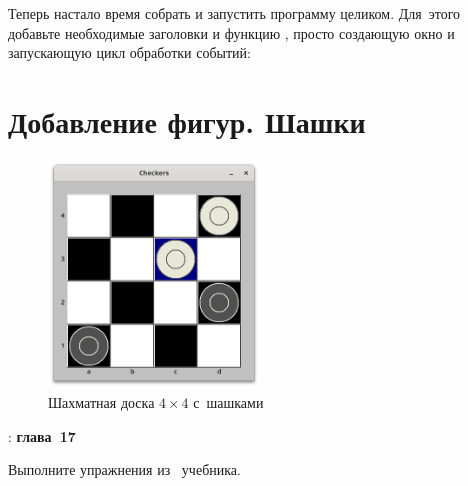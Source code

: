 Теперь настало время собрать и запустить программу целиком. Для~этого добавьте необходимые заголовки и функцию , просто создающую окно  и запускающую цикл обработки событий:




\clearpage
\section{Добавление фигур. Шашки}

\begin{figure}[ht]
    {\centering
        \includegraphics[width=0.5\textwidth]{images/checkers.png}

    }
    \caption{Шахматная доска \(4\times 4\) с~шашками}
    \label{fig:checkers}
\end{figure}




\WhatToReadSection
\textcite{Stroustrup:2016:ru}: \textbf{глава~17}



\ExercisesSection
\begin{exercise}
\item Выполните упражнения из~ учебника.

\end{exercise}
